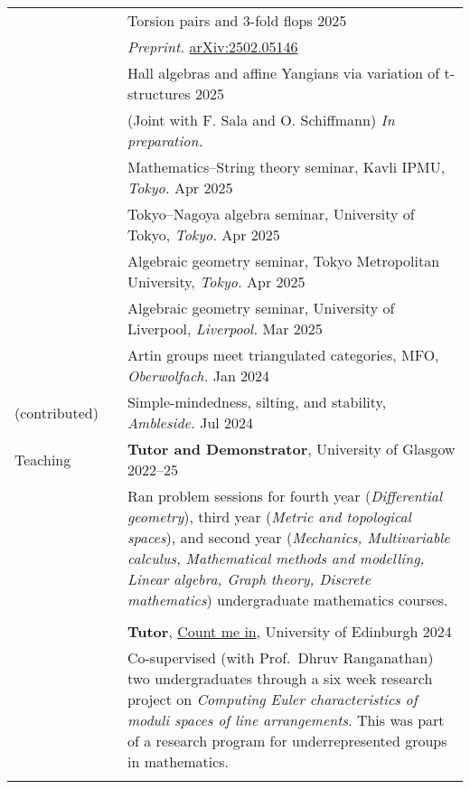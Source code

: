 \documentclass[10pt]{article}
\newcommand{\nextItem}{\\[0.25em]}
\newcommand{\nextSection}{\\[0.5em]}
\begin{document}
\begin{longtable}{>{\raggedleft\arraybackslash}p{0.8in}>{}p{0.05in}>{}p{5.7in}}
        \nextItem
        && Torsion pairs and 3-fold flops \hfill 2025\\
        && \emph{Preprint.}
        \href{https://arxiv.org/abs/2502.05146}{arXiv:2502.05146}
        \nextItem
        && Hall algebras and affine Yangians via variation of t-structures
           \hfill 2025\\
        && (Joint with F. Sala and O. Schiffmann) \emph{In preparation.}
        \nextSection
    \multirow{2}{0.8in}{\raggedleft\arraybackslash Selected talks (invited)}%
        && Mathematics--String theory seminar, Kavli IPMU, \emph{Tokyo.}
        \hfill Apr 2025\nextItem
        && Tokyo--Nagoya algebra seminar, University of Tokyo, \emph{Tokyo.}
        \hfill Apr 2025\nextItem
        && Algebraic geometry seminar, Tokyo Metropolitan University, \emph{Tokyo.}
        \hfill Apr 2025\nextItem
        && Algebraic geometry seminar, University of Liverpool, \emph{Liverpool.}
        \hfill Mar 2025\nextItem
        && Artin groups meet triangulated categories, MFO, \emph{Oberwolfach.}
        \hfill Jan 2024\nextItem
    (contributed)%
        && Simple-mindedness, silting, and stability, \emph{Ambleside.}
        \hfill Jul 2024\nextSection
    Teaching%
        && \textbf{Tutor and Demonstrator}, University of Glasgow \hfill
        2022--25\\[0.25em]
        && \begin{minipage}[c]{4.3in}
        Ran problem sessions for fourth year (\emph{Differential geometry}),
        third year (\emph{Metric and topological spaces}), and second year
        (\emph{Mechanics, Multivariable calculus, Mathematical methods and
        modelling, Linear algebra, Graph theory, Discrete mathematics})
        undergraduate mathematics courses.
        \end{minipage}\\\\[-0.6em]
        && \textbf{Tutor}, \href{https://www.agq-cdt.org/count-me-in/}{Count me
        in}, University of Edinburgh \hfill 2024\\[0.25em]
        && \begin{minipage}[c]{4.3in}
        Co-supervised (with Prof.\ Dhruv Ranganathan) two undergraduates
        through a six week research project on \emph{Computing Euler
        characteristics of moduli spaces of line arrangements}. This was part of
        a research program for underrepresented groups in mathematics.
        \end{minipage}\\\\[-0.6em]

\end{longtable}
\end{document}
